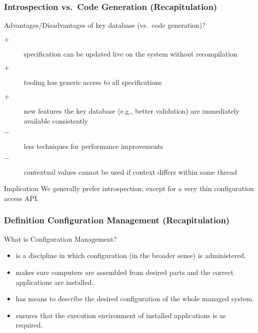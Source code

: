\begin{frame}
	\frametitle{Introspection vs.\ Code Generation (Recapitulation)}

	\begin{task}
	Advantages/Disadvantages of key database (vs.\ code generation)?
	\end{task}

	\pause

	\begin{description} %
	\item[$+$] specification can be updated live on the system without recompilation
	\item[$+$] tooling has generic access to all specifications
 	\item[$+$] new features the key database (e.g., better validation) are immediately available consistently
	\item[$-$] less techniques for performance improvements
	\item[$-$] contextual values cannot be used if context differs within same thread
	\end{description}

	\begin{alertblock}{Implication}
	We generally prefer introspection, except for a very thin configuration access API.
	\end{alertblock}
\end{frame}

\begin{frame}
	\frametitle{Definition Configuration Management (Recapitulation)}

	\begin{task}
	What is Configuration Management?
	\end{task}

	\pause

	\begin{itemize}
	\item is a discipline in which configuration (in the broader sense) is administered.
	\item makes sure computers are assembled from desired parts and the correct applications are installed.
	\item has means to describe the desired configuration of the whole managed system.
	\item ensures that the execution environment of installed applications is as required.
	\end{itemize}
\end{frame}

